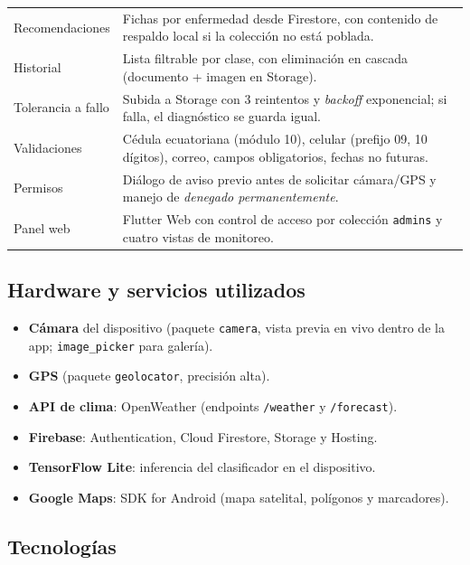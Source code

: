 \documentclass[12pt,a4paper]{article}
\begin{document}
\begin{table}[H]
\begin{tabular}{p{4.3cm} p{9.2cm}}
Recomendaciones & Fichas por enfermedad desde Firestore, con contenido de respaldo local si la colección no está poblada. \\
Historial & Lista filtrable por clase, con eliminación en cascada (documento + imagen en Storage). \\
Tolerancia a fallo & Subida a Storage con 3 reintentos y \textit{backoff} exponencial; si falla, el diagnóstico se guarda igual. \\
Validaciones & Cédula ecuatoriana (módulo 10), celular (prefijo 09, 10 dígitos), correo, campos obligatorios, fechas no futuras. \\
Permisos & Diálogo de aviso previo antes de solicitar cámara/GPS y manejo de \textit{denegado permanentemente}. \\
Panel web & Flutter Web con control de acceso por colección \texttt{admins} y cuatro vistas de monitoreo. \\
\bottomrule
\end{tabular}
\end{table}

\subsection{Hardware y servicios utilizados}

\begin{itemize}
  \item \textbf{Cámara} del dispositivo (paquete \texttt{camera}, vista previa
        en vivo dentro de la app; \texttt{image\_picker} para galería).
  \item \textbf{GPS} (paquete \texttt{geolocator}, precisión alta).
  \item \textbf{API de clima}: OpenWeather (endpoints \texttt{/weather} y
        \texttt{/forecast}).
  \item \textbf{Firebase}: Authentication, Cloud Firestore, Storage y Hosting.
  \item \textbf{TensorFlow Lite}: inferencia del clasificador en el dispositivo.
  \item \textbf{Google Maps}: SDK for Android (mapa satelital, polígonos y
        marcadores).
\end{itemize}

\subsection{Tecnologías}
\end{document}

